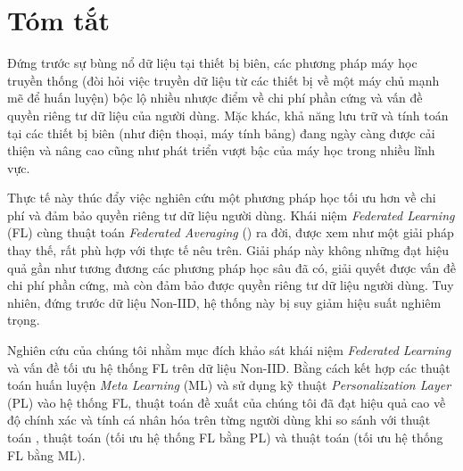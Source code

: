 \chapter*{Tóm tắt}
\label{abstract}

Đứng trước sự bùng nổ dữ liệu tại thiết bị biên, các phương pháp máy học truyền thống (đòi hỏi việc truyền dữ liệu từ các thiết bị về một máy chủ mạnh mẽ để huấn luyện) bộc lộ nhiều nhược điểm về chi phí phần cứng và vấn đề quyền riêng tư dữ liệu của người dùng. Mặc khác, khả năng lưu trữ và tính toán tại các thiết bị biên (như điện thoại, máy tính bảng) đang ngày càng được cải thiện và nâng cao cũng như phát triển vượt bậc của máy học trong nhiều lĩnh vực. 

Thực tế này thúc đẩy việc nghiên cứu một phương pháp học tối ưu hơn về chi phí và đảm bảo quyền riêng tư dữ liệu người dùng. Khái niệm \textit{Federated Learning} (FL) cùng thuật toán \textit{Federated Averaging} () ra đời, được xem như một giải pháp thay thế, rất phù hợp với thực tế nêu trên. Giải pháp này không những đạt hiệu quả gần như tương đương các phương pháp học sâu đã có, giải quyết được vấn đề chi phí phần cứng, mà còn đảm bảo được quyền riêng tư dữ liệu người dùng. Tuy nhiên, đứng trước dữ liệu Non-IID, hệ thống này bị suy giảm hiệu suất nghiêm trọng.

Nghiên cứu của chúng tôi nhằm mục đích khảo sát khái niệm \textit{Federated Learning} và vấn đề tối ưu hệ thống FL trên dữ liệu Non-IID. Bằng cách kết hợp các thuật toán huấn luyện \textit{Meta Learning} (ML) và sử dụng kỹ thuật \textit{Personalization Layer} (PL) vào hệ thống FL, thuật toán đề xuất của chúng tôi đã đạt hiệu quả cao về độ chính xác và tính cá nhân hóa trên từng người dùng khi so sánh với thuật toán , thuật toán  (tối ưu hệ thống FL bằng PL) và thuật toán  (tối ưu hệ thống FL bằng ML).
